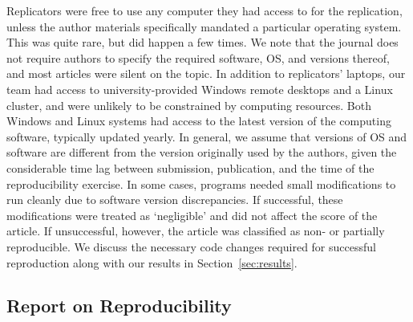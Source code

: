Replicators were free to use any computer they had access to for the replication, unless the author materials specifically mandated a particular operating system. This was quite rare, but did happen a few times. We note that the journal does not require authors to specify the required software, \ac{OS}, and versions thereof, and most articles were silent on the topic. In addition to replicators' laptops, our team had access to university-provided Windows remote desktops and a Linux cluster, and were unlikely to be constrained by computing resources. Both Windows and Linux systems had access to the latest version of the computing software, typically updated yearly.
%
In general, we assume that versions of \ac{OS} and software are different from the version originally used by the authors, given the considerable time lag between submission, publication, and the time of the reproducibility exercise. In some cases, programs needed small modifications to run cleanly due to software version discrepancies. If successful, these modifications were treated as `negligible' and did not affect the score of the article. If unsuccessful, however, the article was classified as non- or partially reproducible. We discuss the necessary code changes required for successful reproduction along with our results in Section~\ref{sec:results}.






\subsection{Report on Reproducibility}

